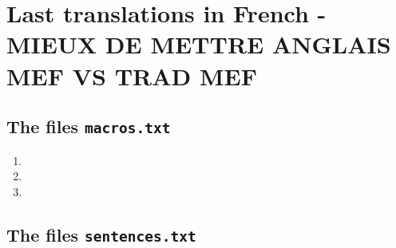\documentclass[twoside]{tutodoc}
\begin{document}
\makeatletter

\section*{Last translations in French - MIEUX DE METTRE ANGLAIS MEF VS TRAD MEF}

\subsection*{The files \texttt{macros.txt}}

\begin{enumerate}
	\item {}


	\item {}
	      
	      
	\item {}
\end{enumerate}



\subsection*{The files \texttt{sentences.txt}}
\end{document}
